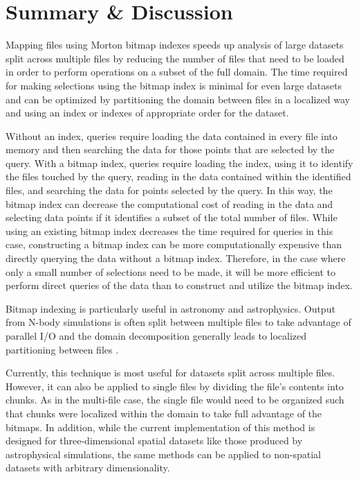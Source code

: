 \documentclass[apjl]{emulateapj}
\newcommand{\todo}[1]{{\color{red}{#1}}}
\begin{document}
\section{Summary \& Discussion}\label{S:discuss}
Mapping files using Morton bitmap indexes speeds up analysis of large datasets split across multiple files by reducing the number of files that need to be loaded in order to perform operations on a subset of the full domain. The time required for making selections using the bitmap index is minimal for even large datasets and can be optimized by partitioning the domain between files in a localized way and using an index or indexes of appropriate order for the dataset. 

Without an index, queries require loading the data contained in every file into memory and then searching the data for those points that are selected by the query. With a bitmap index, queries require loading the index, using it to identify the files touched by the query, reading in the data contained within the identified files, and searching the data for points selected by the query. In this way, the bitmap index can decrease the computational cost of reading in the data and selecting data points if it identifies a subset of the total number of files. While using an existing bitmap index decreases the time required for queries in this case, constructing a bitmap index can be more computationally expensive than directly querying the data without a bitmap index. Therefore, in the case where only a small number of selections need to be made, it will be more efficient to perform direct queries of the data than to construct and utilize the bitmap index.

Bitmap indexing is particularly useful in astronomy and astrophysics. Output from N-body simulations is often split between multiple files to take advantage of parallel I/O and the domain decomposition generally leads to localized partitioning between files \citep{Springel2001,Springel2005b,Hopkins2015}. \todo{applications outside astronomy}

Currently, this technique is most useful for datasets split across multiple files. However, it can also be applied to single files by dividing the file's contents into chunks. As in the multi-file case, the single file would need to be organized such that chunks were localized within the domain to take full advantage of the bitmaps. In addition, while the current implementation of this method is designed for three-dimensional spatial datasets like those produced by astrophysical simulations, the same methods can be applied to non-spatial datasets with arbitrary dimensionality.
\end{document}
